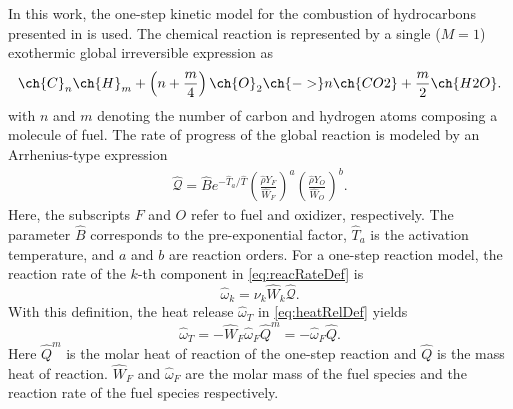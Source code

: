 In this work,  the one-step kinetic model for the combustion of hydrocarbons presented in \textcite{fernandez-tarrazoSimpleOnestepChemistry2006} is used. The chemical reaction is represented by a single ($M = 1$)  exothermic global irreversible expression as
\begin{equation}
	\ch{C}_n \ch{H}_m + \left(n+\frac{m}{4}\right) \ch{O}_2\ch{ -> } n \ch{CO2} + \frac{m}{2} \ch{H2O}.
\end{equation}
with $n$ and $m$ denoting the number of carbon and hydrogen atoms composing a molecule of fuel. The rate of progress of the global reaction is modeled by an Arrhenius-type expression
\begin{align}
	\hat{\mathcal{Q}}= \hat B e^{-\hat T_a/\hat T} \left(\frac{\hat \rho Y_F}{\hat W_F}\right)^a \left(\frac{\hat \rho Y_O}{\hat W_O}\right)^b . \label{eq:DimArr}
\end{align}%
Here, the subscripts $F$ and $O$ refer to fuel and oxidizer, respectively. The parameter $\hat{B}$ corresponds to the pre-exponential factor, $\hat T_a$ is the activation temperature, and $a$ and $b$ are reaction orders. For a one-step reaction model, the reaction rate of the $k$-th component in \cref{eq:reacRateDef} is
\begin{equation}
	\hat \omega_k  =  \nu_{k} \hat W_k\hat{\mathcal{Q}}.
\end{equation}
With this definition, the heat release $\hat \omega_T$ in \cref{eq:heatRelDef} yields
\begin{equation}
	\hat \omega_T = - \hat W_F \hat \omega_F\hat Q^m = - \hat \omega_F\hat Q .
\end{equation}
Here $\hat Q^m$ is the molar heat of reaction of the one-step reaction and $\hat Q$ is the mass heat of reaction. $\hat W_F$ and $ \hat \omega_F$ are the molar mass of the fuel species and the reaction rate of the fuel species respectively.

